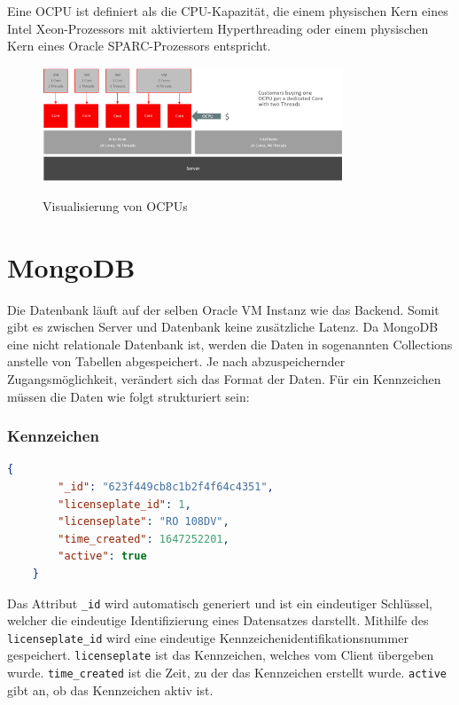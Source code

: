     Eine OCPU ist definiert als die CPU-Kapazität, die einem physischen Kern eines Intel Xeon-Prozessors mit aktiviertem Hyperthreading oder einem physischen Kern eines Oracle SPARC-Prozessors entspricht.
    \begin{figure}[H]
        \centering
        \includegraphics[width=0.8\textwidth]{pics/OCPU.jpg}
        \caption{Visualisierung von OCPUs}
        \cite{ocpuPic}
        \label{fig:vm:OCPU}
    \end{figure}
\cite{vcpuVsocpu}
\section{MongoDB}
Die Datenbank läuft auf der selben Oracle VM Instanz wie das Backend. Somit gibt es zwischen Server und Datenbank keine zusätzliche Latenz. Da MongoDB eine nicht relationale Datenbank ist, werden die Daten in sogenannten Collections anstelle von Tabellen abgespeichert. Je nach abzuspeichernder Zugangsmöglichkeit, verändert sich das Format der Daten.
Für ein Kennzeichen müssen die Daten wie folgt strukturiert sein:

\subsubsection{Kennzeichen}
\begin{lstlisting}[language=JSON, caption=Aufbau eines Kennzeichen in der Datenbank, label=lst:lsg:licenseplate]
    {
        "_id": "623f449cb8c1b2f4f64c4351",
        "licenseplate_id": 1,
        "licenseplate": "RO 108DV",
        "time_created": 1647252201,
        "active": true
    }
\end{lstlisting}
Das Attribut \verb|_id| wird automatisch generiert und ist ein eindeutiger Schlüssel, welcher die eindeutige Identifizierung eines Datensatzes darstellt. Mithilfe des \verb|licenseplate_id| wird eine eindeutige Kennzeichenidentifikationsnummer gespeichert. \verb|licenseplate| ist das Kennzeichen, welches vom Client übergeben wurde. \verb|time_created| ist die Zeit, zu der das Kennzeichen erstellt wurde. \verb|active| gibt an, ob das Kennzeichen aktiv ist.

